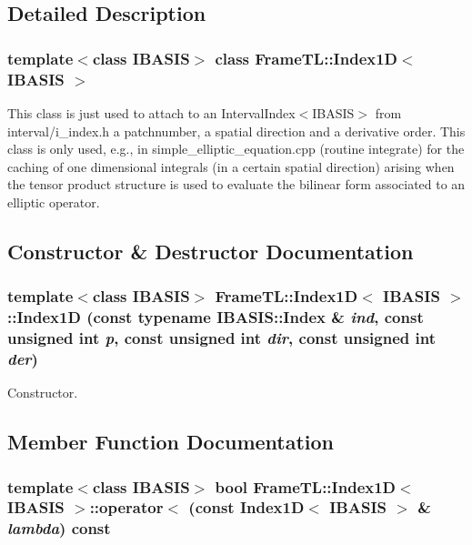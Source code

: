 \subsection{Detailed Description}
\subsubsection*{template$<$class IBASIS$>$ class FrameTL::Index1D$<$ IBASIS $>$}

This class is just used to attach to an IntervalIndex$<$IBASIS$>$ from interval/i\_\-index.h a patchnumber, a spatial direction and a derivative order. This class is only used, e.g., in simple\_\-elliptic\_\-equation.cpp (routine integrate) for the caching of one dimensional integrals (in a certain spatial direction) arising when the tensor product structure is used to evaluate the bilinear form associated to an elliptic operator. 

\subsection{Constructor \& Destructor Documentation}
\hypertarget{classFrameTL_1_1Index1D_009f4a2f3382426f8c0560c7e764e7a8}{
\subsubsection[Index1D]{\setlength{\rightskip}{0pt plus 5cm}template$<$class IBASIS$>$ {\bf FrameTL::Index1D}$<$ IBASIS $>$::{\bf Index1D} (const typename IBASIS::Index \& {\em ind}, \/  const unsigned int {\em p}, \/  const unsigned int {\em dir}, \/  const unsigned int {\em der})}}
\label{classFrameTL_1_1Index1D_009f4a2f3382426f8c0560c7e764e7a8}


Constructor. 

\subsection{Member Function Documentation}
\hypertarget{classFrameTL_1_1Index1D_276b4f8c960e7bce5cac8d63c5c07bad}{
\subsubsection[operator$<$]{\setlength{\rightskip}{0pt plus 5cm}template$<$class IBASIS$>$ bool {\bf FrameTL::Index1D}$<$ IBASIS $>$::operator$<$ (const {\bf Index1D}$<$ IBASIS $>$ \& {\em lambda}) const}}
\label{classFrameTL_1_1Index1D_276b4f8c960e7bce5cac8d63c5c07bad}


